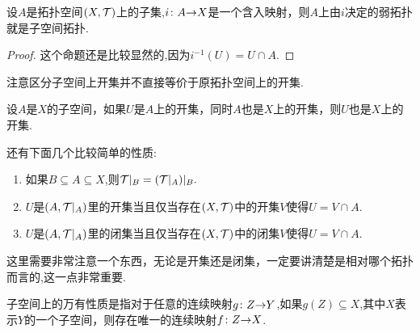 \begin{proposition}
设$A$是拓扑空间$(X,\mathcal{T})$上的子集,${i}\colon{A}{\to}{X}$是一个含入映射，则$A$上由$i$决定的弱拓扑就是子空间拓扑.
\end{proposition}

\begin{proof}
这个命题还是比较显然的,因为$i^{-1}(U)=U \cap A$.
\end{proof}

注意区分子空间上开集并不直接等价于原拓扑空间上的开集.

\begin{lemma}
设$A$是$X$的子空间，如果$U$是$A$上的开集，同时$A$也是$X$上的开集，则$U$也是$X$上的开集.
\end{lemma}


还有下面几个比较简单的性质:

\begin{proposition}
\begin{enumerate}
	\item 如果$B \subseteq A \subseteq X$,则$\mathcal{T}|_B = (\mathcal{T}|_A)|_B.$
	\item $U$是$(A,\mathcal{T}|_A)$里的开集当且仅当存在$(X,\mathcal{T})$中的开集$V$使得$U = V \cap A.$
	\item $U$是$(A,\mathcal{T}|_A)$里的闭集当且仅当存在$(X,\mathcal{T})$中的闭集$V$使得$U = V \cap A.$
\end{enumerate}
\end{proposition}

这里需要非常注意一个东西，无论是开集还是闭集，一定要讲清楚是相对哪个拓扑而言的,这一点非常重要.

\begin{definition}
子空间上的万有性质是指对于任意的连续映射${g}\colon{Z}{\to}{Y}$,如果$g(Z) \subseteq X$,其中$X$表示$Y$的一个子空间，则存在唯一的连续映射${f}\colon{Z}{\to}{X}$.

\begin{center}
\end{center}
\end{definition}


